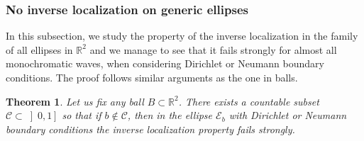 \documentclass{amsart}
\newtheorem{theorem}{Theorem}[section]
\theoremstyle{definition}
\theoremstyle{remark}
\def\RR{\mathbb{R}}
\numberwithin{equation}{section}
\theoremstyle{definition}
\theoremstyle{remark}
\def\RR{\mathbb{R}}
\begin{document}
\subsubsection{No inverse localization on generic ellipses}
In this subsection, we study the property of the inverse localization in the family of all ellipses in $\RR^2$ and we manage to see that it fails strongly for almost all monochromatic waves, when considering Dirichlet or Neumann boundary conditions. The proof follows similar arguments as the one in balls.

\begin{theorem}
	Let us fix any ball $B\subset\RR^2$. There exists a countable subset $\mathcal{C}\subset\left]0,1\right]$ so that if $b\notin\mathcal{C}$, then in the ellipse $\mathcal{E}_{b}$ with Dirichlet or Neumann boundary conditions the inverse localization property fails strongly. 
\end{theorem}
\end{document}
